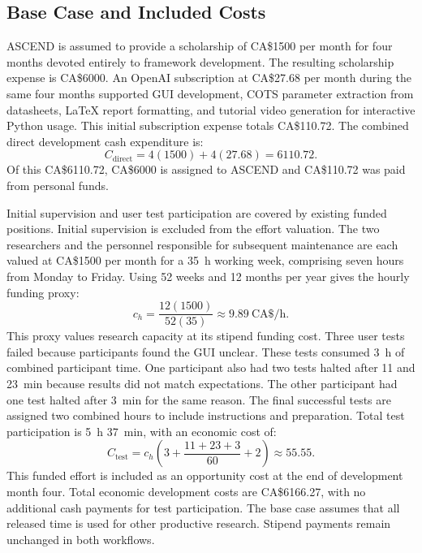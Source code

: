 \subsection{Base Case and Included Costs}

ASCEND is assumed to provide a scholarship of CA\$1500 per month for four months devoted entirely to framework development.
The resulting scholarship expense is CA\$6000.
An OpenAI subscription at CA\$27.68 per month during the same four months supported GUI development, COTS parameter extraction from datasheets, LaTeX report formatting, and tutorial video generation for interactive Python usage.
This initial subscription expense totals CA\$110.72.
The combined direct development cash expenditure is:
\begin{equation}
    C_{\mathrm{direct}}=4(1500)+4(27.68)=6110.72.
    \label{eq:economic-direct-cost}
\end{equation}
Of this CA\$6110.72, CA\$6000 is assigned to ASCEND and CA\$110.72 was paid from personal funds.

Initial supervision and user test participation are covered by existing funded positions.
Initial supervision is excluded from the effort valuation.
The two researchers and the personnel responsible for subsequent maintenance are each valued at CA\$1500 per month for a 35~h working week, comprising seven hours from Monday to Friday.
Using 52 weeks and 12 months per year gives the hourly funding proxy:
\begin{equation}
    c_h=\frac{12(1500)}{52(35)}\approx9.89\ \text{CA\$/h}.
    \label{eq:economic-hourly-value}
\end{equation}
This proxy values research capacity at its stipend funding cost.
Three user tests failed because participants found the GUI unclear.
These tests consumed 3~h of combined participant time.
One participant also had two tests halted after 11 and 23~min because results did not match expectations.
The other participant had one test halted after 3~min for the same reason.
The final successful tests are assigned two combined hours to include instructions and preparation.
Total test participation is 5~h 37~min, with an economic cost of:
\begin{equation}
    C_{\mathrm{test}}=c_h\left(3+\frac{11+23+3}{60}+2\right)\approx55.55.
    \label{eq:economic-test-cost}
\end{equation}
This funded effort is included as an opportunity cost at the end of development month four.
Total economic development costs are CA\$6166.27, with no additional cash payments for test participation.
The base case assumes that all released time is used for other productive research.
Stipend payments remain unchanged in both workflows.

